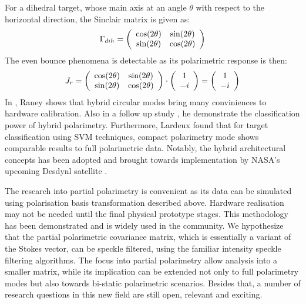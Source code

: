 For a dihedral target, whose main axis at an angle $\theta$ with respect to the horizontal direction, the Sinclair matrix is given as:
\begin{equation}
\Gamma_{dih} = 
\left(
\begin{array}{c c}
\cos(2\theta) & \sin(2\theta) \\
\sin(2\theta) & \cos(2\theta)
\end{array}
\right)
\end{equation}
The even bounce phenomena is detectable as its polarimetric response is then:
\begin{equation}
J_r = \left(
\begin{array}{c c}
\cos(2\theta) & \sin(2\theta) \\
\sin(2\theta) & \cos(2\theta)
\end{array}
\right) \cdot
\left(
\begin{array}{c}
1 \\
-i
\end{array}
\right) = \left(
\begin{array}{c}
1 \\
-i
\end{array}
\right) 
\end{equation}
In \cite{Raney_2007_IGARSS}, Raney shows that hybrid circular modes bring many conviniences to hardware calibration.
Also in a follow up study \cite{Raney_2007_TGRS}, he demonstrate the classification power of hybrid polarimetry.
Furthermore, Lardeux \cite{Lardeux_2007_ESASP} found that for target classification using SVM techniques, compact polarimetry mode shows comparable results to full polarimetric data.
Notably, the hybrid architectural concepts has been adopted and brought towards implementation by NASA's upcoming Desdynl satellite \cite{Raney_2009_RadarConf}.

The research into partial polarimetry is convenient as its data can be simulated using polarisation basis transformation described above.
Hardware realisation may not be needed until the final physical prototype stages.
This methodology has been demonstrated and is widely used in the community.
We hypothesize that the partial polarimetric covariance matrix, which is essentially a variant of the Stokes vector, can be speckle filtered, using the familiar intensity speckle filtering algorithms.
The focus into partial polarimetry allow analysis into a smaller matrix, while its implication can be extended not only to full polarimetry modes but also towards bi-static polarimetric scenarios.
Besides that, a number of research questions in this new field are still open, relevant and exciting.

